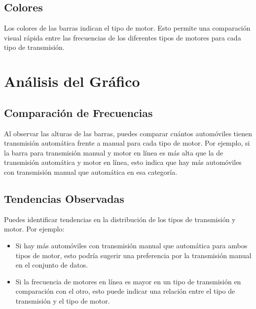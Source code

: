 \documentclass{article}
\begin{document}
\subsection{Colores}
Los colores de las barras indican el tipo de motor. Esto permite una comparación visual rápida entre las frecuencias de los diferentes tipos de motores para cada tipo de transmisión.

\section{Análisis del Gráfico}

\subsection{Comparación de Frecuencias}
Al observar las alturas de las barras, puedes comparar cuántos automóviles tienen transmisión automática frente a manual para cada tipo de motor. Por ejemplo, si la barra para transmisión manual y motor en línea es más alta que la de transmisión automática y motor en línea, esto indica que hay más automóviles con transmisión manual que automática en esa categoría.

\subsection{Tendencias Observadas}
Puedes identificar tendencias en la distribución de los tipos de transmisión y motor. Por ejemplo:
\begin{itemize}
	\item Si hay más automóviles con transmisión manual que automática para ambos tipos de motor, esto podría sugerir una preferencia por la transmisión manual en el conjunto de datos.
	\item Si la frecuencia de motores en línea es mayor en un tipo de transmisión en comparación con el otro, esto puede indicar una relación entre el tipo de transmisión y el tipo de motor.
\end{itemize}
\end{document}
